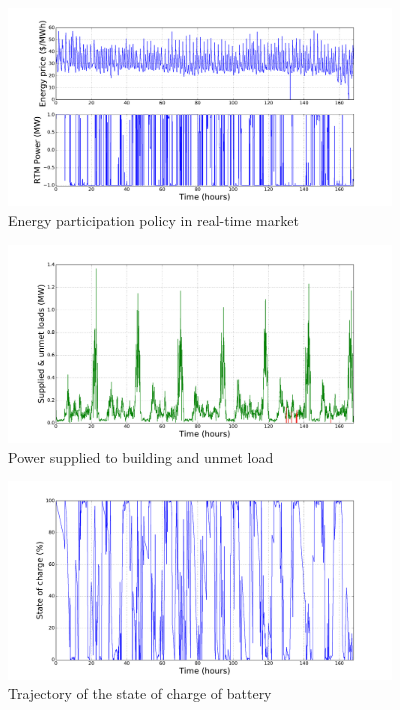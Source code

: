 \documentclass[11pt,twoside]{article}
\begin{document}
\begin{figure}[h!]
\begin{center}
\includegraphics[width=4in]{Figures/Plots/fullproblem_stoch/Prtm_fp_st.pdf} \caption{Energy participation policy in real-time market}\label{Prtm_fp_st}\end{center}
\end{figure}
\begin{figure}[h!]
\begin{center}
\includegraphics[width=4in]
{Figures/Plots/fullproblem_stoch/supp_unmet_fp_st.pdf} \caption{Power supplied to building and unmet load}\label{supp_unmet_fp_st}\end{center}
\end{figure}
\begin{figure}[h!]
\begin{center}
\includegraphics[width=4in]
{Figures/Plots/fullproblem_stoch/soc_fp_st.pdf} \caption{Trajectory of the state of charge of battery}\label{soc_fp_st}\end{center}
\end{figure}
\end{document}
